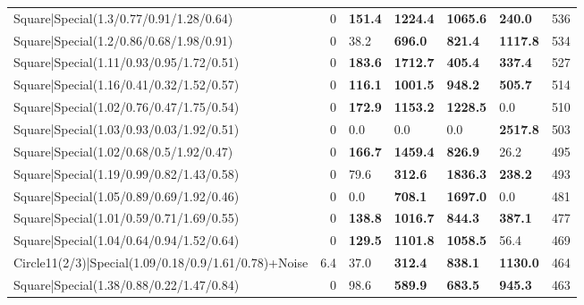 \begin{tabular}{lrllllr}
 Square|Special(1.3/0.77/0.91/1.28/0.64)                       &             0   & \textbf{151.4} & \textbf{1224.4} & \textbf{1065.6} & \textbf{240.0}  &          536 \\
 Square|Special(1.2/0.86/0.68/1.98/0.91)                       &             0   & 38.2           & \textbf{696.0}  & \textbf{821.4}  & \textbf{1117.8} &          534 \\
 Square|Special(1.11/0.93/0.95/1.72/0.51)                      &             0   & \textbf{183.6} & \textbf{1712.7} & \textbf{405.4}  & \textbf{337.4}  &          527 \\
 Square|Special(1.16/0.41/0.32/1.52/0.57)                      &             0   & \textbf{116.1} & \textbf{1001.5} & \textbf{948.2}  & \textbf{505.7}  &          514 \\
 Square|Special(1.02/0.76/0.47/1.75/0.54)                      &             0   & \textbf{172.9} & \textbf{1153.2} & \textbf{1228.5} & 0.0             &          510 \\
 Square|Special(1.03/0.93/0.03/1.92/0.51)                      &             0   & 0.0            & 0.0             & 0.0             & \textbf{2517.8} &          503 \\
 Square|Special(1.02/0.68/0.5/1.92/0.47)                       &             0   & \textbf{166.7} & \textbf{1459.4} & \textbf{826.9}  & 26.2            &          495 \\
 Square|Special(1.19/0.99/0.82/1.43/0.58)                      &             0   & 79.6           & \textbf{312.6}  & \textbf{1836.3} & \textbf{238.2}  &          493 \\
 Square|Special(1.05/0.89/0.69/1.92/0.46)                      &             0   & 0.0            & \textbf{708.1}  & \textbf{1697.0} & 0.0             &          481 \\
 Square|Special(1.01/0.59/0.71/1.69/0.55)                      &             0   & \textbf{138.8} & \textbf{1016.7} & \textbf{844.3}  & \textbf{387.1}  &          477 \\
 Square|Special(1.04/0.64/0.94/1.52/0.64)                      &             0   & \textbf{129.5} & \textbf{1101.8} & \textbf{1058.5} & 56.4            &          469 \\
 Circle11(2/3)|Special(1.09/0.18/0.9/1.61/0.78)+Noise          &             6.4 & 37.0           & \textbf{312.4}  & \textbf{838.1}  & \textbf{1130.0} &          464 \\
 Square|Special(1.38/0.88/0.22/1.47/0.84)                      &             0   & 98.6           & \textbf{589.9}  & \textbf{683.5}  & \textbf{945.3}  &          463 \\

\end{tabular}

